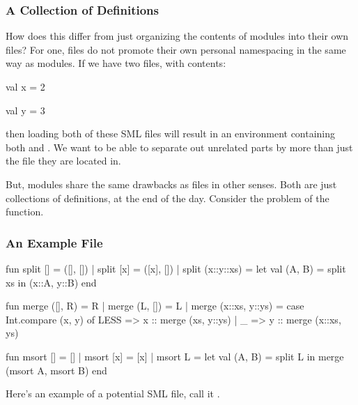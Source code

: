 \documentclass[aspectratio=169, handout]{beamer}
\begin{document}
\begin{frame}[fragile]
  \frametitle{A Collection of Definitions}

  How does this differ from just organizing the contents of modules into
  their own files? For one, files do not promote their own personal
  namespacing in the same way as modules. If we have two files, with contents:

  \begin{codeblock}
    val x = 2
  \end{codeblock}

  \begin{codeblock}
    val y = 3
  \end{codeblock}

  then loading both of these SML files will result in an environment containing
  both  and . We want to be able to separate out unrelated parts
  by more than just the file they are located in.

  \pause
  \vspace{\fill}

  But, modules share the same drawbacks as files in other senses. Both are just
  collections of definitions, at the end of the day. Consider the problem of
  the  function.
\end{frame}

\begin{frame}[fragile]
  \frametitle{An Example File}

  {\tiny
  \begin{codeblock}
    fun split [] = ([], [])
      | split [x] = ([x], [])
      | split (x::y::xs) =
          let
            val (A, B) = split xs
          in
            (x::A, y::B)
          end

    fun merge ([], R) = R
      | merge (L, []) = L
      | merge (x::xs, y::ys) =
          case Int.compare (x, y) of
            LESS => x :: merge (xs, y::ys)
          | _ => y :: merge (x::xs, ys)

    fun msort [] = []
      | msort [x] = [x]
      | msort L =
          let
            val (A, B) = split L
          in
            merge (msort A, msort B)
          end
  \end{codeblock}
  }

  \pause
  \vspace{\fill}

  Here's an example of a potential SML file, call it .
\end{frame}
\end{document}
